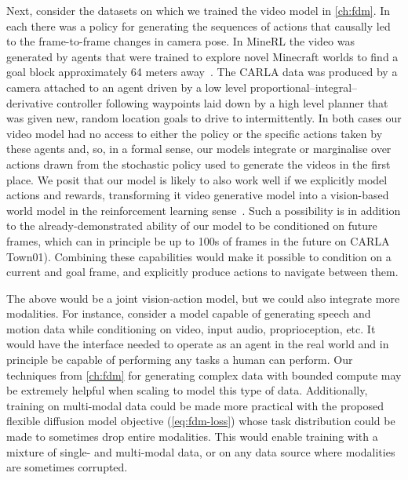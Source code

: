 Next, consider the datasets on which we trained the video model in \cref{ch:fdm}. In each there was a policy for generating the sequences of actions that causally led to the frame-to-frame changes in camera pose. In MineRL the video was generated by agents that were trained to explore novel Minecraft worlds to find a goal block approximately 64 meters away~\citep{saxena2021clockwork}. The CARLA data was produced by a camera attached to an agent driven by a low level proportional–integral–derivative controller following waypoints laid down by a high level planner that was given new, random location goals to
drive to intermittently. In both cases our video model had no access to either the policy or the specific actions taken by these agents and, so, in a formal sense, our models integrate or marginalise over actions drawn from the stochastic policy used to generate the videos in the first place. We posit that our model is likely to also work well if we explicitly model actions and rewards, transforming it video generative model into a vision-based world model in the reinforcement learning sense~\citep{kaiser2019model}. Such a possibility is in addition to the already-demonstrated ability of our model to be conditioned on future frames, which can in principle be up to 100s of frames in the future on CARLA Town01). Combining these capabilities would make it possible to condition on a current and goal frame, and explicitly produce actions to navigate between them.

The above would be a joint vision-action model, but we could also integrate more modalities. For instance, consider a model capable of generating speech and motion data while conditioning on video, input audio, proprioception, etc. It would have the interface needed to operate as an agent in the real world and in principle be capable of performing any tasks a human can perform. Our techniques from \cref{ch:fdm} for generating complex data with bounded compute may be extremely helpful when scaling to model this type of data. Additionally, training on multi-modal data could be made more practical with the proposed flexible diffusion model objective (\cref{eq:fdm-loss}) whose task distribution could be made to sometimes drop entire modalities. This would enable training with a mixture of single- and multi-modal data, or on any data source where modalities are sometimes corrupted.



